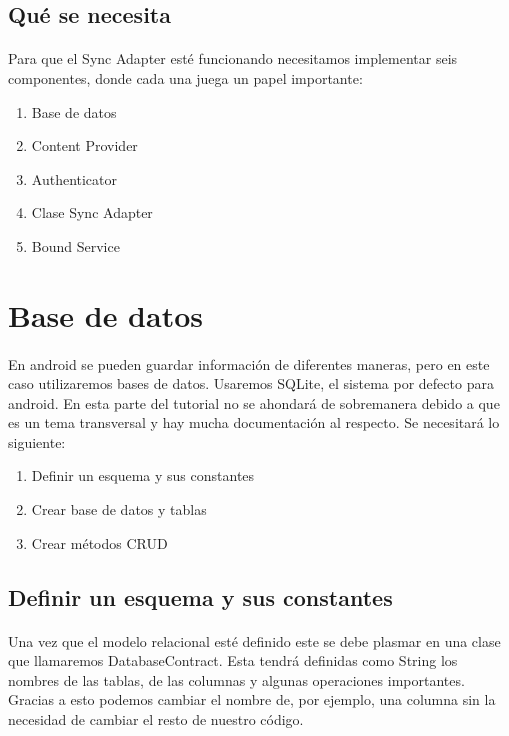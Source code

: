 \documentclass[10pt]{extarticle}
\begin{document}
\subsection{Qué se necesita}

\paragraph{}
Para que el Sync Adapter esté funcionando necesitamos implementar seis componentes, donde cada una juega un papel importante:

\begin{enumerate}
 \item Base de datos
 \item Content Provider
 \item Authenticator
 \item Clase Sync Adapter
 \item Bound Service
\end{enumerate}



\section{Base de datos}

\paragraph{}
En android se pueden guardar información de diferentes maneras, pero en este caso utilizaremos bases de datos. Usaremos SQLite, el sistema por defecto para android. En esta parte del tutorial no se ahondará de sobremanera debido a que es un tema transversal y hay mucha documentación al respecto. Se necesitará lo siguiente:

\begin{enumerate}
 \item Definir un esquema y sus constantes
 \item Crear base de datos y tablas
 \item Crear métodos CRUD
\end{enumerate}

\subsection{Definir un esquema y sus constantes}

\paragraph{}
Una vez que el modelo relacional esté definido este se debe plasmar en una clase que llamaremos DatabaseContract. Esta tendrá definidas como String los nombres de las tablas, de las columnas y algunas operaciones importantes. Gracias a esto podemos cambiar el nombre de, por ejemplo, una columna sin la necesidad de cambiar el resto de nuestro código.
\end{document}
